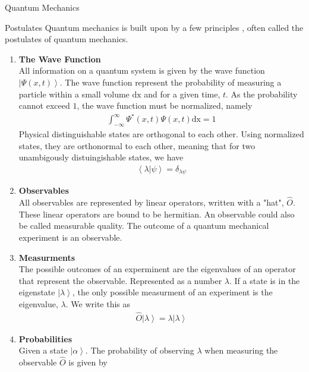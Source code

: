 \documentclass[twoside,english]{uiofysmaster}
\begin{document}
\begin{chapter}{Quantum Mechanics}
 	
	\begin{section}{Postulates}
 		Quantum mechanics is built upon by a few principles \cite{Audun,Griffiths,Sakurai,Susskind2014}, often called the postulates of quantum mechanics. 
 		\begin{enumerate}
 			\item \textbf{The Wave Function} \\
 			All information on a quantum system is given by the wave function $\left| \Psi(x,t) \right>$. The wave function represent the probability of measuring a particle within a small volume $\text{dx}$ and for a given time, $t$. As the probability cannot exceed $1$, the wave function must be normalized, namely
 			\begin{align}
 				\int_{-\infty}^\infty \Psi^*(x,t) \Psi(x,t) \text{dx} = 1
 			\end{align}
 			Physical distinguishable states are orthogonal to each other. Using normalized states, they are orthonormal to each other, meaning that for two unambigously distuingishable states, we have
 			\begin{align}
 				\left< \lambda | \psi \right> = \delta_{\lambda \psi}
 			\end{align}
 			\item \textbf{Observables}\\
			All observables are represented by linear operators, written with a "hat", $\hat O$. These linear operators are bound to be hermitian. An observable could also be called measurable quality. The outcome of a quantum mechanical experiment is an observable. 
			\item \textbf{Measurments}\\
			The possible outcomes of an experminent are the eigenvalues of an operator that represent the observable. Represented as a number $\lambda$. If a state is in the eigenstate $\left| \lambda \right>$, the only possible measurment of an experiment is the eigenvalue, $\lambda$. We write this as
 			\begin{align}
 				\hat O \left| \lambda \right> = \lambda \left| \lambda \right>
 			\end{align}
 			\item \textbf{Probabilities}\\
 			Given a state $\left| \alpha \right>$. The probability of observing $\lambda$ when measuring the observable $\hat O$ is given by 
 			\begin{align}

\end{align}
\end{enumerate}
\end{section}
\end{chapter}
\end{document}
